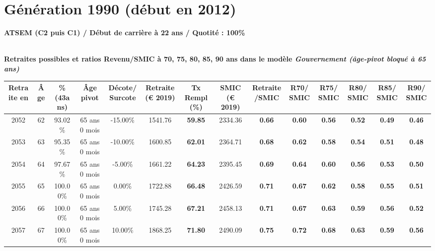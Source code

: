 \newpage 
 
\section{Génération 1990 (début en 2012)\label{ATSEM_100_22_1990_0}} 
 
{\bf \noindent ATSEM (C2 puis C1) / Début de carrière à 22 ans / Quotité : 100\%}  ~ 

 ~\\{\bf \noindent Retraites possibles et ratios Revenu/SMIC à 70, 75, 80, 85, 90 ans dans le modèle \emph{Gouvernement (âge-pivot bloqué à 65 ans)}}  
 
\begin{adjustbox}{max width=\textwidth} 
\begin{tabular}[htb]{|c|c||c|c|c||c|c||c|c||c|c|c|c|c|} 
\hline 
 Retraite en &  Âge &  \%(43ans) &  Âge pivot &  Décote/Surcote &  Retraite (\euro{} 2019) &  Tx Rempl(\%) &  SMIC (\euro{} 2019) &  Retraite/SMIC &  R70/SMIC &  R75/SMIC &  R80/SMIC &  R85/SMIC &  R90/SMIC \\ 
\hline \hline 
 2052 &  62 &  93.02\% &  65 ans 0 mois &  -15.00\% &  1541.76 &  {\bf 59.85} &  2334.36 &  {\bf {\color{red} 0.66}} &  {\bf {\color{red} 0.60}} &  {\bf {\color{red} 0.56}} &  {\bf {\color{red} 0.52}} &  {\bf {\color{red} 0.49}} &  {\bf {\color{red} 0.46}} \\ 
\hline 
 2053 &  63 &  95.35\% &  65 ans 0 mois &  -10.00\% &  1600.85 &  {\bf 62.01} &  2364.71 &  {\bf {\color{red} 0.68}} &  {\bf {\color{red} 0.62}} &  {\bf {\color{red} 0.58}} &  {\bf {\color{red} 0.54}} &  {\bf {\color{red} 0.51}} &  {\bf {\color{red} 0.48}} \\ 
\hline 
 2054 &  64 &  97.67\% &  65 ans 0 mois &  -5.00\% &  1661.22 &  {\bf 64.23} &  2395.45 &  {\bf {\color{red} 0.69}} &  {\bf {\color{red} 0.64}} &  {\bf {\color{red} 0.60}} &  {\bf {\color{red} 0.56}} &  {\bf {\color{red} 0.53}} &  {\bf {\color{red} 0.50}} \\ 
\hline 
 2055 &  65 &  100.00\% &  65 ans 0 mois &  0.00\% &  1722.88 &  {\bf 66.48} &  2426.59 &  {\bf {\color{red} 0.71}} &  {\bf {\color{red} 0.67}} &  {\bf {\color{red} 0.62}} &  {\bf {\color{red} 0.58}} &  {\bf {\color{red} 0.55}} &  {\bf {\color{red} 0.51}} \\ 
\hline 
 2056 &  66 &  100.00\% &  65 ans 0 mois &  5.00\% &  1745.28 &  {\bf 67.21} &  2458.13 &  {\bf {\color{red} 0.71}} &  {\bf {\color{red} 0.67}} &  {\bf {\color{red} 0.63}} &  {\bf {\color{red} 0.59}} &  {\bf {\color{red} 0.56}} &  {\bf {\color{red} 0.52}} \\ 
\hline 
 2057 &  67 &  100.00\% &  65 ans 0 mois &  10.00\% &  1868.25 &  {\bf 71.80} &  2490.09 &  {\bf {\color{red} 0.75}} &  {\bf {\color{red} 0.72}} &  {\bf {\color{red} 0.68}} &  {\bf {\color{red} 0.63}} &  {\bf {\color{red} 0.59}} &  {\bf {\color{red} 0.56}} \\ 
\hline 
\hline 
\end{tabular} 
\end{adjustbox} 
 
